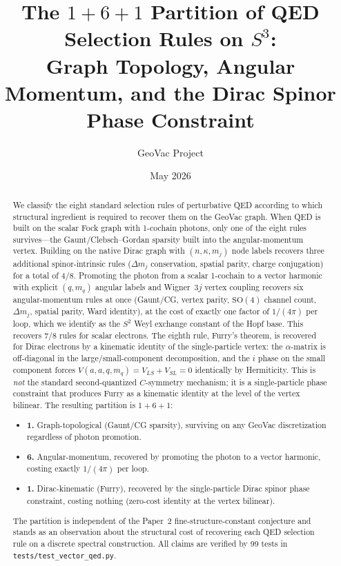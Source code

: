 \documentclass[11pt]{article}
\title{The $1{+}6{+}1$ Partition of QED Selection Rules on $S^3$:\\
Graph Topology, Angular Momentum, and the Dirac Spinor Phase Constraint}
\author{GeoVac Project}
\date{May 2026}
\begin{document}
\maketitle

\begin{abstract}
We classify the eight standard selection rules of perturbative QED
according to which structural ingredient is required to recover them
on the GeoVac graph.  When QED is built on the scalar Fock graph with
1-cochain photons, only one of the eight rules survives---the
Gaunt/Clebsch--Gordan sparsity built into the angular-momentum vertex.
Building on the native Dirac graph with $(n, \kappa, m_j)$ node labels
recovers three additional spinor-intrinsic rules ($\Delta m_j$
conservation, spatial parity, charge conjugation) for a total of
4/8.  Promoting the photon from a scalar 1-cochain to a vector
harmonic with explicit $(q, m_q)$ angular labels and Wigner~$3j$
vertex coupling recovers six angular-momentum rules at once
(Gaunt/CG, vertex parity, $\mathrm{SO}(4)$ channel count, $\Delta m_j$,
spatial parity, Ward identity), at the cost of exactly one factor of
$1/(4\pi)$ per loop, which we identify as the $S^2$ Weyl exchange
constant of the Hopf base.  This recovers 7/8 rules for scalar
electrons.  The eighth rule, Furry's theorem, is recovered for Dirac
electrons by a kinematic identity of the single-particle vertex: the
$\alpha$-matrix is off-diagonal in the large/small-component
decomposition, and the $i$ phase on the small component forces
$V(a, a, q, m_q) = V_{LS} + V_{SL} = 0$ identically by Hermiticity.
This is \emph{not} the standard second-quantized $C$-symmetry
mechanism; it is a single-particle phase constraint that produces
Furry as a kinematic identity at the level of the vertex bilinear.
The resulting partition is $1{+}6{+}1$:
\begin{itemize}\setlength{\itemsep}{0pt}
\item[]\textbf{1.} Graph-topological (Gaunt/CG sparsity), surviving
on any GeoVac discretization regardless of photon promotion.
\item[]\textbf{6.} Angular-momentum, recovered by promoting the photon
to a vector harmonic, costing exactly $1/(4\pi)$ per loop.
\item[]\textbf{1.} Dirac-kinematic (Furry), recovered by the
single-particle Dirac spinor phase constraint, costing nothing
(zero-cost identity at the vertex bilinear).
\end{itemize}
The partition is independent of the Paper~2 fine-structure-constant
conjecture and stands as an observation about the structural cost of
recovering each QED selection rule on a discrete spectral
construction.  All claims are verified by 99 tests in
\texttt{tests/test\_vector\_qed.py}.
\end{abstract}
\end{document}
